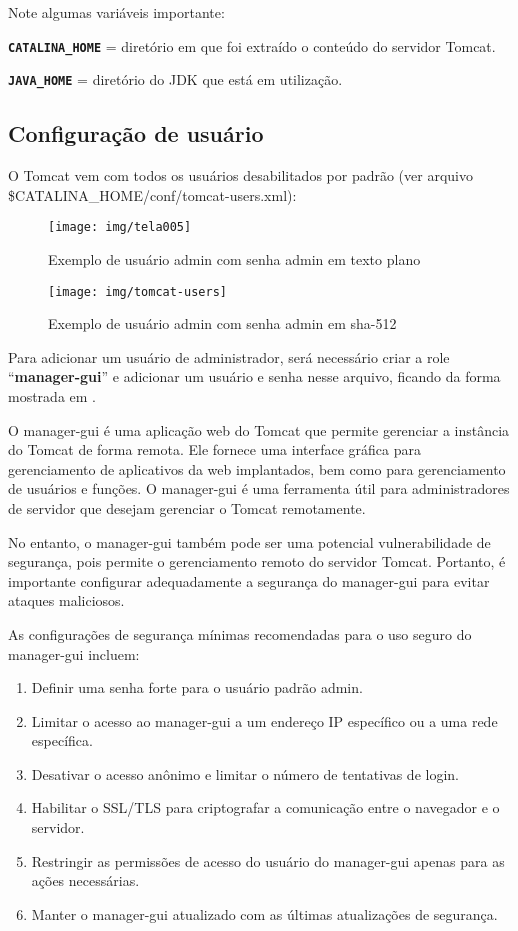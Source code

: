 Note algumas variáveis importante:

\texttt{\textbf{CATALINA\_HOME}} = diretório em que foi extraído o conteúdo do servidor Tomcat.

\texttt{\textbf{JAVA\_HOME}} = diretório do JDK que está em utilização.

\subsection{Configuração de usuário}

O Tomcat vem com todos os usuários desabilitados por padrão (ver arquivo\\ \$CATALINA\_HOME/conf/tomcat-users.xml):

\begin{figure}[H]
	\centering
	\caption[tomcat-users.xml]{Exemplo de usuário admin com senha admin em texto plano}
	\texttt{[image: img/tela005]}
	\label{fig:tomcat-users-texto-plano}
\end{figure}

\begin{figure}[H]
	\centering
	\caption[tomcat-users.xml]{Exemplo de usuário admin com senha admin em sha-512}
	\texttt{[image: img/tomcat-users]}
	\label{fig:tomcat-users}
\end{figure}


Para adicionar um usuário de administrador, será necessário criar a role “\textbf{manager-gui}” e adicionar um usuário e senha nesse arquivo, ficando da forma mostrada em .

O manager-gui é uma aplicação web do Tomcat que permite gerenciar a instância do Tomcat de forma remota. Ele fornece uma interface gráfica para gerenciamento de aplicativos da web implantados, bem como para gerenciamento de usuários e funções. O manager-gui é uma ferramenta útil para administradores de servidor que desejam gerenciar o Tomcat remotamente.

No entanto, o manager-gui também pode ser uma potencial vulnerabilidade de segurança, pois permite o gerenciamento remoto do servidor Tomcat. Portanto, é importante configurar adequadamente a segurança do manager-gui para evitar ataques maliciosos.

As configurações de segurança mínimas recomendadas para o uso seguro do manager-gui incluem:

\begin{enumerate}
	\item Definir uma senha forte para o usuário padrão admin.
	\item 	Limitar o acesso ao manager-gui a um endereço IP específico ou a uma rede específica.
	\item 	Desativar o acesso anônimo e limitar o número de tentativas de login.
	\item 	Habilitar o SSL/TLS para criptografar a comunicação entre o navegador e o servidor.
	\item 	Restringir as permissões de acesso do usuário do manager-gui apenas para as ações necessárias.
	\item 	Manter o manager-gui atualizado com as últimas atualizações de segurança.
\end{enumerate}

